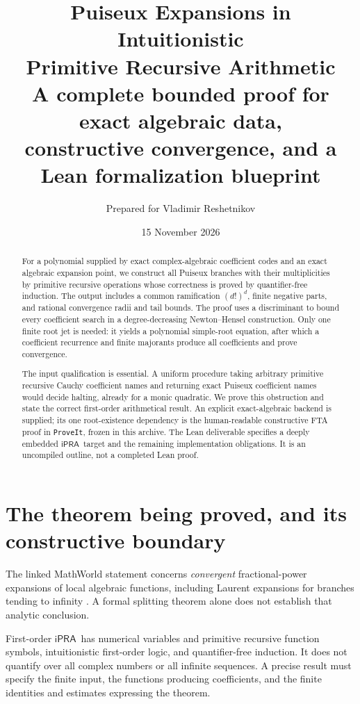 \documentclass[11pt]{article}
\title{\textbf{Puiseux Expansions in Intuitionistic\\
Primitive Recursive Arithmetic}\\[6pt]
\large A complete bounded proof for exact algebraic data,\\
constructive convergence, and a Lean formalization blueprint}
\author{Prepared for Vladimir Reshetnikov}
\date{15 November 2026}
\theoremstyle{definition}
\newcommand{\ipra}{\ensuremath{\mathsf{iPRA}}}
\newcommand{\repo}{\texttt{ProveIt}}
\begin{document}
\maketitle
\begin{abstract}
For a polynomial supplied by exact complex-algebraic coefficient codes and an
exact algebraic expansion point, we construct all Puiseux branches with their
multiplicities by primitive recursive operations whose correctness is proved
by quantifier-free induction. The output includes a common ramification
\((d!)^d\), finite negative parts, and rational convergence radii and tail bounds.
The proof uses a discriminant to bound every coefficient search in a
degree-decreasing Newton--Hensel construction. Only one finite root jet is
needed: it yields a polynomial simple-root equation, after which a coefficient
recurrence and finite majorants produce all coefficients and prove convergence.

The input qualification is essential. A uniform procedure taking arbitrary
primitive recursive Cauchy coefficient names and returning exact Puiseux
coefficient names would decide halting, already for a monic quadratic. We prove
this obstruction and state the correct first-order arithmetical result.
An explicit exact-algebraic backend is supplied; its one root-existence
dependency is the human-readable constructive FTA proof in \repo, frozen in
this archive. The Lean deliverable specifies a deeply embedded \ipra\ target
and the remaining implementation obligations. It is an uncompiled outline,
not a completed Lean proof.
\end{abstract}
\newpage
\tableofcontents
\newpage

\section{The theorem being proved, and its constructive boundary}
\label{sec:scope}
The linked MathWorld statement concerns \emph{convergent} fractional-power
expansions of local algebraic functions, including Laurent expansions for
branches tending to infinity \cite{mathworld}. A formal splitting theorem
alone does not establish that analytic conclusion.

First-order \ipra\ has numerical variables and primitive recursive function
symbols, intuitionistic first-order logic, and quantifier-free induction.
It does not quantify over all complex numbers or all infinite sequences.
A precise result must specify the finite input, the functions producing
coefficients, and the finite identities and estimates expressing the theorem.
\end{document}
